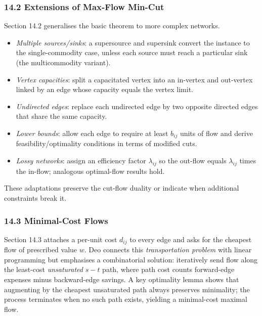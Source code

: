 \documentclass{article}
\theoremstyle{theorem}
\theoremstyle{definition}
\theoremstyle{remark}
\begin{document}
\subsubsection*{\textbf{14.2} Extensions of Max-Flow Min-Cut}
Section 14.2 generalises the basic theorem to more complex networks.  
\begin{itemize}[nosep]
  \item \emph{Multiple sources/sinks}: a supersource and supersink convert the instance to the single-commodity case, unless each source must reach a particular sink (the multicommodity variant).  
  \item \emph{Vertex capacities}: split a capacitated vertex into an in-vertex and out-vertex linked by an edge whose capacity equals the vertex limit.  
  \item \emph{Undirected edges}: replace each undirected edge by two opposite directed edges that share the same capacity.  
  \item \emph{Lower bounds}: allow each edge to require at least \(b_{ij}\) units of flow and derive feasibility/optimality conditions in terms of modified cuts.  
  \item \emph{Lossy networks}: assign an efficiency factor \(\lambda_{ij}\) so the out-flow equals \(\lambda_{ij}\) times the in-flow; analogous optimal-flow results hold.  
\end{itemize}
These adaptations preserve the cut-flow duality or indicate when additional constraints break it. \cite{Deo}

\subsubsection*{\textbf{14.3} Minimal-Cost Flows}
Section 14.3 attaches a per-unit cost \(d_{ij}\) to every edge and asks for the cheapest flow of prescribed value \(w\).  Deo connects this \emph{transportation problem} with linear programming but emphasises a combinatorial solution: iteratively send flow along the least-cost \emph{unsaturated} \(s\!-\!t\) path, where path cost counts forward-edge expenses minus backward-edge savings.  A key optimality lemma shows that augmenting by the cheapest unsaturated path always preserves minimality; the process terminates when no such path exists, yielding a minimal-cost maximal flow. \cite{Deo}

\newpage
\end{document}
